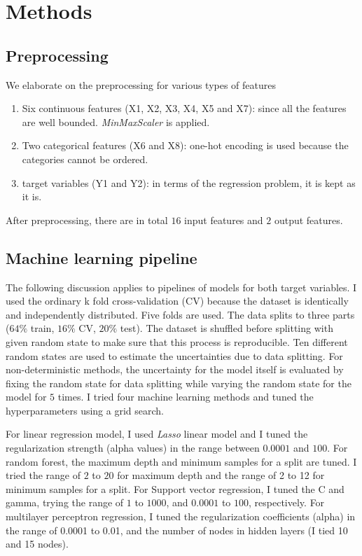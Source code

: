\documentclass{article}
\begin{document}
\section{Methods \label{sec:methods}}
\subsection{Preprocessing}
We elaborate on the preprocessing for various types of features

\begin{enumerate}
	\item[\bullet] Six continuous features (X1, X2, X3, X4, X5 and X7): since all the features are well bounded. \textit{MinMaxScaler} is applied. 

	\item[\bullet] Two categorical features (X6 and X8): one-hot encoding is used because the categories cannot be ordered.

	\item[\bullet] target variables (Y1 and Y2): in terms of the regression problem, it is kept as it is. 
\end{enumerate}
After preprocessing, there are in total $16$ input features and $2$ output features.

\subsection{Machine learning pipeline}
The following discussion applies to pipelines of models for both target variables. I used the ordinary k fold cross-validation (CV) because the dataset is identically and independently distributed.
Five folds are used. The data splits to three parts ($64\%$ train, $16\%$ CV, $20\%$ test). The dataset is shuffled before splitting with given random state to make sure that this process is reproducible. Ten different random states  are used to estimate the uncertainties  due to data splitting. For non-deterministic methods, the uncertainty for the model itself is evaluated by fixing the random state for data splitting while varying the random state for the model for $5$ times. I tried four machine learning methods and tuned the hyperparameters using a grid search.

For linear regression model, I used \textit{Lasso} linear model and I tuned the regularization strength (alpha values) in the range between $0.0001$ and $100$.
For random forest, the maximum depth and minimum samples for a split are tuned. I tried the range of $2$ to $20$ for maximum depth and the range of 2 to 12 for minimum samples for a split. 
For Support vector regression, I tuned the C and gamma, trying the range of 
$1$ to $1000$, and $0.0001$ to $100$, respectively. 
For multilayer perceptron regression, I tuned the regularization coefficients (alpha) in the range of 0.0001 to 0.01, and the number of nodes in hidden layers (I tied 10 and 15 nodes). 
\end{document}

